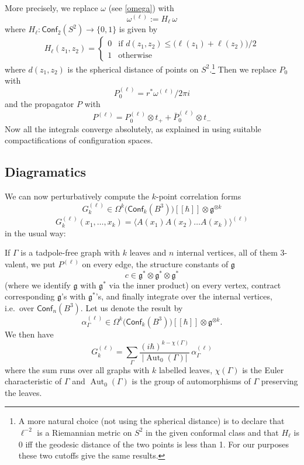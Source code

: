 \documentclass[a4paper]{amsart}
\theoremstyle{plain}
\theoremstyle{definition}
\newcommand{\on}{\operatorname}
\newcommand{\g}{\mathfrak{g}}
\newcommand{\la}{\langle}
\newcommand{\ra}{\rangle}
\newcommand{\cf}{\mathsf{Conf}}
\begin{document}
More precisely, we replace $\omega$ (see \eqref{omega}) with
$$\omega^{(\ell)}:=H_\ell\, \omega$$
where $H_\ell\colon\cf_2(S^2)\to\{0,1\}$ is given by
$$
H_\ell(z_1,z_2)=
\begin{cases}
0 & \text{if } d(z_1,z_2)\leq \bigl(\ell(z_1)+\ell(z_2)\bigr)/2\\
1 & \text{otherwise}
\end{cases}
$$
where $d(z_1,z_2)$ is the spherical distance of points on $S^2$.\footnote{%
A more natural choice (not using the spherical distance) is to declare that $\ell^{-2}$ is a Riemannian metric on $S^2$ in the given conformal class and that $H_\ell$ is 0 iff the geodesic distance of the two points is less than 1. For our purposes these two cutoffs give the same results.}
Then we replace $P_0$ with
$$P_0^{(\ell)}=r^*\omega^{(\ell)}/2\pi i$$
and the propagator $P$ with
$$P^{(\ell)}=P_0^{(\ell)}\otimes t_+ + \bar P_0^{(\ell)}\otimes t_-$$
 Now all the integrals converge absolutely, as explained in \cite{AS,K} using suitable compactifications of configuration spaces.

\subsection{Diagramatics}


We can now perturbatively compute the $k$-point correlation forms%
$$G_k^{(\ell)}\in\Omega^k\bigl(\cf_k(B^3)\bigr)[\![\hbar]\!]\otimes\g^{\otimes k}$$
$$G_k^{(\ell)}(x_1,\dots,x_k)=\bigl\la A(x_1)A(x_2)\dots A(x_k)\bigr\ra^{(\ell)}$$
in the usual way:

If $\Gamma$ is a tadpole-free graph with $k$ leaves and $n$ internal vertices, all of them 3-valent, we put $P^{(\ell)}$ on every  edge, the structure constants of $\g$
$$c\in\g^*\otimes\g^*\otimes\g^*$$
(where we identify $\g$ with $\g^*$ via the inner product) on every vertex, contract corresponding $\g$'s with $\g^*$'s, and finally integrate over the internal vertices, i.e.\ over $\cf_n(B^3)$.  Let us denote the result by
$$\alpha^{(\ell)}_{\Gamma}\in\Omega^k\bigl(\cf_k(B^3)\bigr)[\![\hbar]\!]\otimes\g^{\otimes k}.$$
We then have
$$G_k^{(\ell)}= 
\sum_\Gamma \frac{(i\hbar)^{k-\chi(\Gamma)}}{|\on{Aut}_0(\Gamma)|}\,\alpha^{(\ell)}_{\Gamma}$$ 
where the sum runs over all graphs with $k$ labelled leaves, $\chi(\Gamma)$ is the Euler characteristic of $\Gamma$ and $\on{Aut}_0(\Gamma)$ is the group of automorphisms of $\Gamma$ preserving the leaves.
\end{document}
